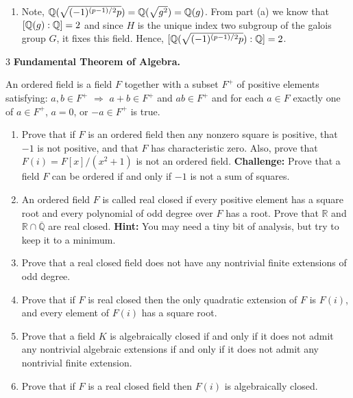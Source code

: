 \documentclass[12pt]{article}
\begin{document}
\begin{solution}
\begin{enumerate}
        \item [(g)] Note, $\mathbb Q(\sqrt{(-1)^{(p-1)/2}p}) = \mathbb Q(\sqrt{g^2}) = \mathbb Q(g)$. From part (a) we know that $[\mathbb Q(g) : \mathbb Q] = 2$ and since $H$ is the unique index two subgroup of the galois group $G$, it fixes this field. Hence, $[\mathbb Q(\sqrt{(-1)^{(p-1)/2}p}): \mathbb Q] = 2$.
    \end{enumerate}
\end{solution}

\newpage 

\begin{problem}{3}
\textbf{Fundamental Theorem of Algebra.}

An ordered field is a field $F$ together with a subset $F^+$ of positive elements satisfying: $a,b \in F^+$ $\Rightarrow$ $a+b \in F^+$ and $ab \in F^+$ and for each $a \in F$ exactly one of $a \in F^+$, $a=0$, or $-a \in F^+$ is true.

\begin{enumerate}
\item[(a)] Prove that if $F$ is an ordered field then any nonzero square is positive, that $-1$ is not positive, and that $F$ has characteristic zero. Also, prove that $F(i) = F[x]/(x^2 + 1)$ is not an ordered field. \textbf{Challenge:} Prove that a field $F$ can be ordered if and only if $-1$ is not a sum of squares.

\item[(b)] An ordered field $F$ is called real closed if every positive element has a square root and every polynomial of odd degree over $F$ has a root. Prove that $\mathbb{R}$ and $\mathbb{R} \cap \overline{\mathbb{Q}}$ are real closed. \textbf{Hint:} You may need a tiny bit of analysis, but try to keep it to a minimum.

\item[(c)] Prove that a real closed field does not have any nontrivial finite extensions of odd degree.

\item[(d)] Prove that if $F$ is real closed then the only quadratic extension of $F$ is $F(i)$, and every element of $F(i)$ has a square root.

\item[(e)] Prove that a field $K$ is algebraically closed if and only if it does not admit any nontrivial algebraic extensions if and only if it does not admit any nontrivial finite extension.

\item[(f)] Prove that if $F$ is a real closed field then $F(i)$ is algebraically closed. 


\end{enumerate}
\end{problem}
\end{document}
